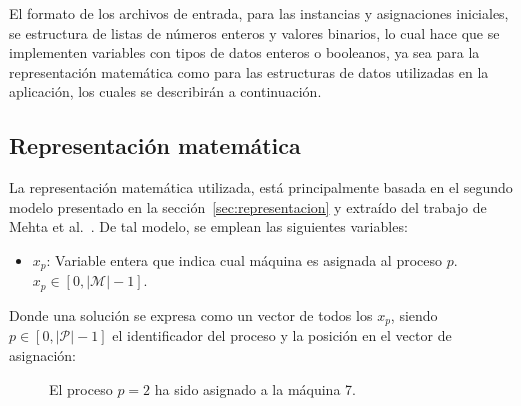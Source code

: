 \documentclass[../informe2.tex]{subfiles}
\begin{document}
El formato de los archivos de entrada, para las instancias y asignaciones iniciales, se estructura de listas de números enteros y valores binarios, lo cual hace que se implementen variables con tipos de datos enteros o booleanos, ya sea para la representación matemática como para las estructuras de datos utilizadas en la aplicación, los cuales se describirán a continuación.

\subsection{Representación matemática}
La representación matemática utilizada, está principalmente basada en el segundo modelo presentado en la sección~\ref{sec:representacion} y  extraído del trabajo de Mehta et al.~\cite{mehta2012comparing}. De tal modelo, se emplean las siguientes variables:
\begin{itemize}
	\item $x_p$: Variable entera que indica cual máquina es asignada al proceso $p$. $x_p \in [0,|\mathcal{M}|-1]$.
\end{itemize}
Donde una solución se expresa como un vector de todos los $x_p$, siendo $p \in [0,|\mathcal{P}|-1]$ el identificador del proceso y la posición en el vector de asignación:
\bigskip
\begin{figure}[ht]
	\centering
	\caption{\small El proceso $p = 2$ ha sido asignado a la máquina 7.}\label{vectorsolucion}
\end{figure}
\end{document}
